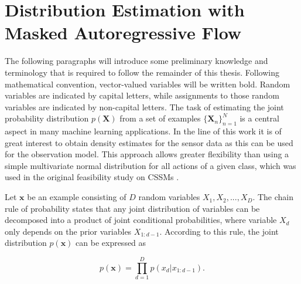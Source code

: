 \documentclass[11pt,titlepage,oneside,openany]{book}
\begin{document}
\section{Distribution Estimation with Masked Autoregressive Flow}
\label{sec:maf}
The following paragraphs will introduce some preliminary knowledge and terminology that is required to follow the remainder  of this thesis. Following mathematical convention, vector-valued variables will be written bold. Random variables are indicated by capital letters, while assignments to those random variables are indicated by non-capital letters.
The task of estimating the joint probability distribution $p(\pmb{X})$ from a set of examples $\{\pmb{X}_n\}^N_{n=1}$ is a central aspect in many machine learning applications. In the line of this work it is of great interest to obtain density estimates for the sensor data as this can be used for the observation model. This approach allows greater flexibility than using a simple multivariate normal distribution for all actions of a given class, which was used in the original feasibility study on CSSMs \cite{kruger_computational_2014}.

Let $\pmb{x}$ be an example consisting of $D$ random variables $X_1, X_2,...,X_D$. The chain rule of probability states that any joint distribution of variables can be decomposed into a product of joint conditional probabilities, where variable $X_d$ only depends on the prior variables $X_{1:d-1}$. According to this rule, the joint distribution $p(\pmb{x})$ can be expressed as

\begin{equation}
	\label{func:chain}
	p(\pmb{x}) = \prod_{d=1}^{D} p(x_d|x_{1:d-1}).
\end{equation}
\end{document}
